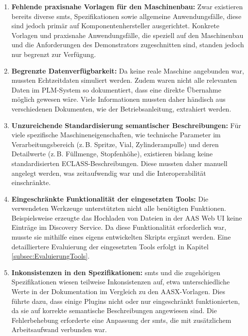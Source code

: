 \begin{enumerate}
    \item \textbf{Fehlende praxisnahe Vorlagen für den Maschinenbau:}  
    Zwar existieren bereits diverse \acsp{smt}, Spezifikationen sowie allgemeine Anwendungsfälle, diese sind jedoch primär auf Komponentenhersteller ausgerichtet.  
    Konkrete Vorlagen und praxisnahe Anwendungsfälle, die speziell auf den Maschinenbau und die Anforderungen des Demonstrators zugeschnitten sind, standen jedoch nur begrenzt zur Verfügung.

    \item \textbf{Begrenzte Datenverfügbarkeit:}  
    Da keine reale Maschine angebunden war, mussten Echtzeitdaten simuliert werden.  
    Zudem waren nicht alle relevanten Daten im PLM-System so dokumentiert, dass eine direkte Übernahme möglich gewesen wäre.  
    Viele Informationen mussten daher händisch aus verschiedenen Dokumenten, wie der Betriebsanleitung, extrahiert werden.  

    \item \textbf{Unzureichende Standardisierung semantischer Beschreibungen:}  
    Für viele spezifische Maschineneigenschaften, wie technische Parameter im Verarbeitungsbereich (z.\,B. Spritze, Vial, Zylinderampulle) und deren Detailwerte (z.\,B. Füllmenge, Stopfenhöhe), existieren bislang keine standardisierten ECLASS-Beschreibungen.  
    Diese mussten daher manuell angelegt werden, was zeitaufwendig war und die Interoperabilität einschränkte.

    \item \textbf{Eingeschränkte Funktionalität der eingesetzten Tools:}  
    Die verwendeten Werkzeuge unterstützten nicht alle benötigten Funktionen.  
    Beispielsweise erzeugte das Hochladen von Dateien in der AAS Web UI keine Einträge im Discovery Service.  
    Da diese Funktionalität erforderlich war, musste sie mithilfe eines eigens entwickelten Skripts ergänzt werden.  
    Eine detailliertere Evaluierung der eingesetzten Tools erfolgt in Kapitel \ref{subsec:EvaluierungTools}.

    \item \textbf{Inkonsistenzen in den Spezifikationen:}  
    \acsp{smt} und die zugehörigen Spezifikationen wiesen teilweise Inkonsistenzen auf, etwa unterschiedliche Werte in der Dokumentation im Vergleich zu den AASX-Vorlagen.  
    Dies führte dazu, dass einige Plugins nicht oder nur eingeschränkt funktionierten, da sie auf korrekte semantische Beschreibungen angewiesen sind.  
    Die Fehlerbehebung erforderte eine Anpassung der \acsp{smt}, die mit zusätzlichem Arbeitsaufwand verbunden war.
\end{enumerate}

